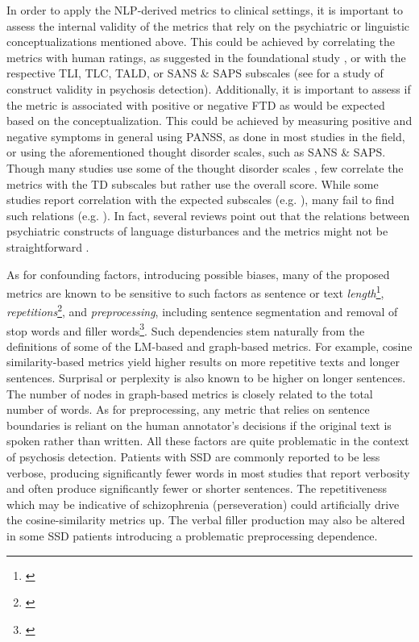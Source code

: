 In order to apply the NLP-derived metrics to clinical settings, it is important to assess the internal validity of the metrics that rely on the psychiatric or linguistic conceptualizations mentioned above. This could be achieved by correlating the metrics with human ratings, as suggested in the foundational study \citet{elvevaag2007quantifying}, or with the respective TLI, TLC, TALD, or SANS \& SAPS subscales (see \citet{bilgrami2022construct} for a study of construct validity in psychosis detection). Additionally, it is important to assess if the metric is associated with positive or negative FTD as would be expected based on the conceptualization. This could be achieved by measuring positive and negative symptoms in general using PANSS, as done in most %
studies in the field, or using the aforementioned thought disorder scales, such as SANS \& SAPS. Though many studies use some of the thought disorder scales %
, few correlate the metrics with the TD subscales but rather use the overall score. While some studies report correlation with the expected subscales (e.g. \citet{vail2018toward, just2020modeling, jeong2023exploring}), many fail to find such relations (e.g. \citet{bedi2015automated, corcoran2018prediction, iter2018automatic, hitczenko2021understanding}). In fact, several reviews point out that the relations between psychiatric constructs of language disturbances and the metrics might not be straightforward \citep{cohen2017can, holmlund2022towards}.

As for confounding factors, introducing possible biases, many of the proposed metrics are known to be sensitive to such factors as sentence or text \textit{length}\footnote{\citet{elvevaag2007quantifying, mota2014graph, iter2018automatic, corcoran2018prediction, hitczenko2021understanding, parola2022speech, jeong2023exploring}}, \textit{repetitions}\footnote{\citet{elvevaag2007quantifying, iter2018automatic, just2019coherence}}, and \textit{preprocessing}, including sentence segmentation and removal of stop words and filler words\footnote{\citet{parola2022speech, holmlund2022towards}}. Such dependencies stem naturally from the definitions of some of the LM-based and graph-based metrics. For example, cosine similarity-based metrics yield higher results on more repetitive texts and longer sentences. Surprisal or perplexity is also known to be higher on longer sentences. The number of nodes in graph-based metrics is closely related to the total number of words. As for preprocessing, any metric that relies on sentence boundaries is reliant on the human annotator's decisions if the original text is spoken rather than written. All these factors are quite problematic in the context of psychosis detection. Patients with SSD are commonly reported to be less verbose, producing significantly fewer words in most studies that report verbosity and often produce significantly fewer or shorter sentences. The repetitiveness which may be indicative of schizophrenia (perseveration) could artificially drive the cosine-similarity metrics up. The verbal filler production may also be altered in some SSD patients introducing a problematic preprocessing dependence.

